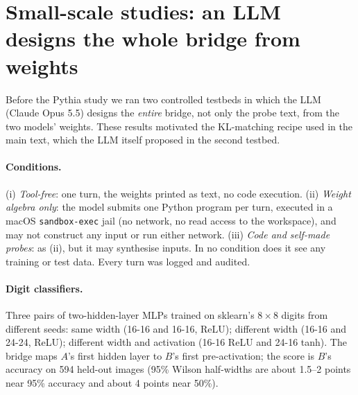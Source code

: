\section{Small-scale studies: an LLM designs the whole bridge from weights}
\label{app:small}

Before the Pythia study we ran two controlled testbeds in which the LLM (Claude Opus 5.5) designs the \emph{entire} bridge, not only the probe text, from the two models' weights. These results motivated the KL-matching recipe used in the main text, which the LLM itself proposed in the second testbed.

\paragraph{Conditions.} (i) \emph{Tool-free}: one turn, the weights printed as text, no code execution. (ii) \emph{Weight algebra only}: the model submits one Python program per turn, executed in a macOS \texttt{sandbox-exec} jail (no network, no read access to the workspace), and may not construct any input or run either network. (iii) \emph{Code and self-made probes}: as (ii), but it may synthesise inputs. In no condition does it see any training or test data. Every turn was logged and audited.

\paragraph{Digit classifiers.} Three pairs of two-hidden-layer MLPs trained on sklearn's $8\times8$ digits from different seeds: same width (16-16 and 16-16, ReLU); different width (16-16 and 24-24, ReLU); different width and activation (16-16 ReLU and 24-16 tanh). The bridge maps $A$'s first hidden layer to $B$'s first pre-activation; the score is $B$'s accuracy on 594 held-out images (95\% Wilson half-widths are about 1.5--2 points near 95\% accuracy and about 4 points near 50\%).

